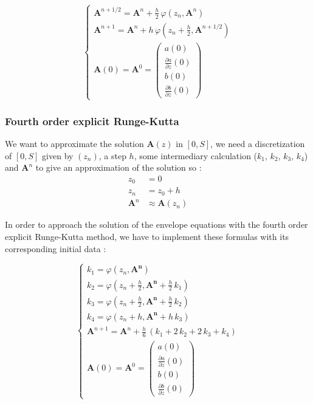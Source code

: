 \documentclass[10pt]{article}
\newcommand{\D}{{\partial}}
\begin{document}
$$\left\lbrace \begin{array}{l}
\mathbf{A}^{n+1/2} = \mathbf{A}^{n} + \frac{h}{2}\,\varphi\left(z_n,\mathbf{A}^n\right) \\
\mathbf{A}^{n+1} = \mathbf{A}^{n} + h\,\varphi\left(z_n+\frac{h}{2},\mathbf{A}^{n+1/2}\right) \\
\mathbf{A}(0) = \mathbf{A}^{0} = \left(\begin{array}{c}
a(0) \\ \frac{\D a}{\D z}(0) \\ b(0) \\ \frac{\D b}{\D z}(0)
\end{array}\right)
\end{array} \right. $$


\subsubsection{Fourth order explicit Runge-Kutta}


We want to approximate the solution $\mathbf{A}(z)$ in $[0, S]$, we need a discretization of $[0, S]$ given by $(z_n)$, a step $h$, some intermediary calculation ($k_1,\,k_2,\,k_3,\,k_4$) and $\mathbf{A}^n$ to give an approximation of the solution so :
\begin{align*}
z_0 &= 0 \\
z_n &= z_0 + h \\
\mathbf{A}^n &\approx \mathbf{A}(z_n)
\end{align*}

In order to approach the solution of the envelope equations with the fourth order explicit Runge-Kutta method, we have to implement these formulas with its corresponding initial data :

$$\left\lbrace \begin{array}{l}
k_1 = \varphi\left(z_n,\mathbf{A^n}\right) \\
k_2 = \varphi\left(z_n+\frac{h}{2},\mathbf{A^n}+\frac{h}{2}\,k_1\right) \\
k_3 = \varphi\left(z_n+\frac{h}{2},\mathbf{A^n}+\frac{h}{2}\,k_2\right) \\
k_4 = \varphi\left(z_n+h,\mathbf{A^n}+h\,k_3\right) \\

\mathbf{A}^{n+1} = \mathbf{A}^{n} + \frac{h}{6}\,(k_1+2\,k_2+2\,k_3+k_4) \\
\mathbf{A}(0) = \mathbf{A}^{0} = \left(\begin{array}{c}
a(0) \\ \frac{\D a}{\D z}(0) \\ b(0) \\ \frac{\D b}{\D z}(0)
\end{array}\right)
\end{array} \right. $$
\end{document}
